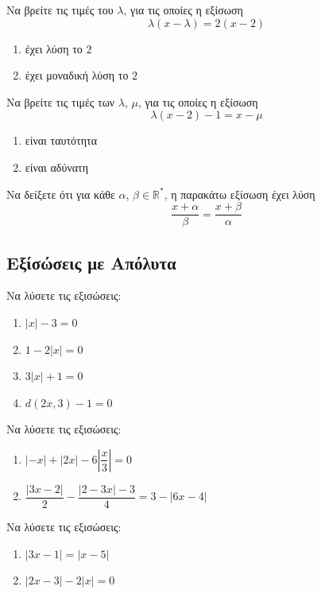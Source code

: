 \documentclass{presentation}
\begin{document}
\begin{askisi}
  Να βρείτε τις τιμές του $λ$, για τις οποίες η εξίσωση
  $$λ(x-λ)=2(x-2)$$
  \begin{enumerate}[<+->]
    \item έχει λύση το $2$
    \item έχει μοναδική λύση το $2$
  \end{enumerate}
\end{askisi}

\begin{askisi}
  Να βρείτε τις τιμές των $λ$, $μ$, για τις οποίες η εξίσωση
  $$λ(x-2)-1=x-μ$$
  \begin{enumerate}[<+->]
    \item είναι ταυτότητα
    \item είναι αδύνατη
  \end{enumerate}
\end{askisi}

\begin{askisi}
  Να δείξετε ότι για κάθε $α$, $β\in\mathbb{R}^*$, η παρακάτω εξίσωση έχει λύση
  $$\frac{x+α}{β}=\frac{x+β}{α}$$
\end{askisi}

\subsection{Εξίσώσεις με Απόλυτα}

\begin{askisi}
  Να λύσετε τις εξισώσεις:
  \begin{enumerate}[<+->]
    \item $|x|-3=0$
    \item $1-2|x|=0$
    \item $3|x|+1=0$
    \item $d(2x,3)-1=0$
  \end{enumerate}
\end{askisi}

\begin{askisi}
  Να λύσετε τις εξισώσεις:
  \begin{enumerate}[<+->]
    \item $|-x|+|2x|-6\left| \dfrac{x}{3} \right|=0$
    \item $\dfrac{|3x-2|}{2}-\dfrac{|2-3x|-3}{4}=3-|6x-4|$
  \end{enumerate}
\end{askisi}

\begin{askisi}
  Να λύσετε τις εξισώσεις:
  \begin{enumerate}[<+->]
    \item $|3x-1|=|x-5|$
    \item $|2x-3|-2|x|=0$
  \end{enumerate}
\end{askisi}
\end{document}
